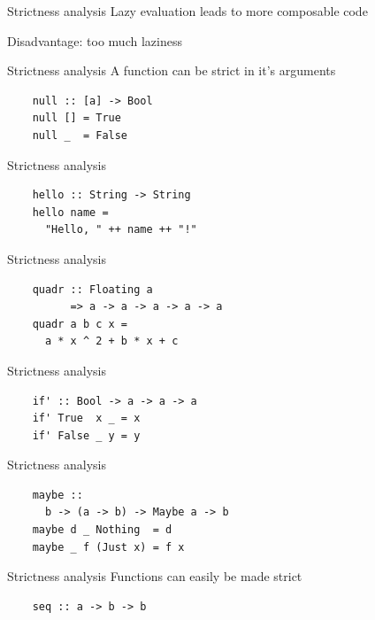 \documentclass[20pt]{beamer}
\newcommand{\vspaced}{
    \vspace{5mm}
}
\begin{document}
\begin{frame}{Strictness analysis}
    Lazy evaluation leads to more composable code \\
    \vspaced
    Disadvantage: too much laziness
\end{frame}

\begin{frame}[fragile]{Strictness analysis}
    A function can be strict in it's arguments
    \vspaced
    \begin{lstlisting}
    null :: [a] -> Bool
    null [] = True
    null _  = False
    \end{lstlisting}
\end{frame}

\begin{frame}[fragile]{Strictness analysis}
    \begin{lstlisting}
    hello :: String -> String
    hello name =
      "Hello, " ++ name ++ "!"
    \end{lstlisting}
\end{frame}

\begin{frame}[fragile]{Strictness analysis}
    \begin{lstlisting}
    quadr :: Floating a
          => a -> a -> a -> a -> a
    quadr a b c x =
      a * x ^ 2 + b * x + c
    \end{lstlisting}
\end{frame}

\begin{frame}[fragile]{Strictness analysis}
    \begin{lstlisting}
    if' :: Bool -> a -> a -> a
    if' True  x _ = x
    if' False _ y = y
    \end{lstlisting}
\end{frame}

\begin{frame}[fragile]{Strictness analysis}
    \begin{lstlisting}
    maybe ::
      b -> (a -> b) -> Maybe a -> b
    maybe d _ Nothing  = d
    maybe _ f (Just x) = f x
    \end{lstlisting}
\end{frame}

\begin{frame}[fragile]{Strictness analysis}
    Functions can easily be made strict \\
    \vspaced
    \begin{lstlisting}
    seq :: a -> b -> b
    \end{lstlisting}
\end{frame}
\end{document}
